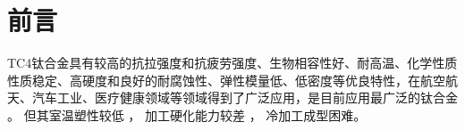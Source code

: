 \documentclass[
class = book,
zihao = -4,
font = noto,
paper = a4paper,
openany
]{easybook}
\begin{document}
\chapter{前言}
%
%

TC4钛合金具有较高的抗拉强度和抗疲劳强度、生物相容性好、耐高温、化学性质性质稳定、高硬度和良好的耐腐蚀性、弹性模量低、低密度等优良特性，在航空航天、汽车工业、医疗健康领域等领域得到了广泛应用，是目前应用最广泛的钛合金 。 但其室温塑性较低 ， 加工硬化能力较差 ， 冷加工成型困难。
\end{document}
